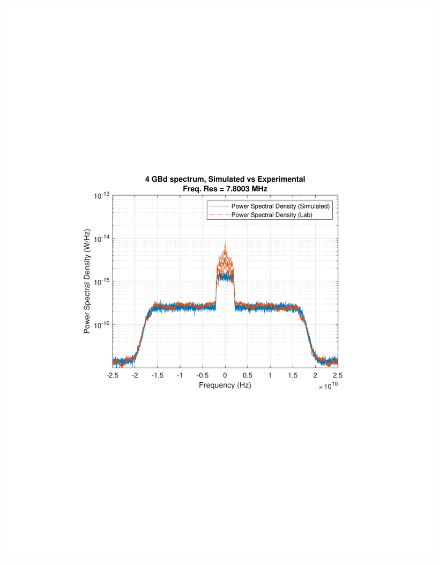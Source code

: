 	\begin{figure}[H]
		\centering
		\begin{minipage}{0.43\textwidth}
			\centering
			\includegraphics[clip, trim=2cm 8cm 2cm 8cm,
			width=1\textwidth]{./sdf/m_qam_system/figures/experimental/exampleComparisons/lbsmSpec4GBdEfOptNH_sameBer.pdf}
			\subcaption{\label{fig:specSuper4}}
		\end{minipage}
		\begin{minipage}{0.43\textwidth}
			\centering

\end{minipage}
\end{figure}

